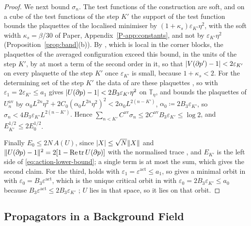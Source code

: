 \documentclass[11pt]{preprint}
\DeclarePairedDelimiter{\abs}{\lvert}{\rvert}
\DeclarePairedDelimiter{\norm}{\lVert}{\rVert}
\numberwithin{equation}{section}
\theoremstyle{definition}
\theoremstyle{remark}
\theoremstyle{plain}
\begin{document}
\begin{proof}
We next bound $\sigma_n$. The test functions of the construction are soft, and on a cube of the test functions of the step $K'$ the support of the test function bounds the plaquettes of the localised minimiser by $(1 + \kappa_s)\varepsilon_{K'}\eta^2$, with the soft width $\kappa_s = \beta/30$ of Paper, Appendix~\ref{P-app:constants}, and not by $\varepsilon_{K'}\eta^2$ (Proposition~\ref{prop:band}(b)). By \cite[Proposition~2]{BalabanAVG}, which is local in the corner blocks, the plaquettes of the averaged configuration exceed this bound, in the units of the step $K'$, by at most a term of the second order in it, so that $\abs{V(\partial p') - 1} < 2\varepsilon_{K'}$ on every plaquette of the step $K'$ once $\varepsilon_{K'}$ is small, because $1 + \kappa_s < 2$. For the determining set of the step $K'$ the data of \cite[(7)]{BalabanVAR} are these plaquettes \cite[p.~278, ll.~39--40]{BalabanVAR}, so \cite[Theorem~1, p.~279]{BalabanVAR} with $\varepsilon_1 = 2\varepsilon_{K'} \leq a_1$ gives $\abs{U(\partial p) - 1} < 2B_3\varepsilon_{K'}\eta^2$ on $\mathbb T_\eta$, and \cite[(53)]{BalabanAVG} bounds the plaquettes of $U^{\mathrm{av}}_n$ by $\alpha_0L^{2n}\eta^2 + 2C_0(\alpha_0L^{2n}\eta^2)^2 < 2\alpha_0L^{2(n-K')}$, $\alpha_0 \coloneqq 2B_3\varepsilon_{K'}$, so $\sigma_n < 4B_3\varepsilon_{K'}L^{2(n-K')}$. Hence $\sum_{n<K'}C^{\mathrm{av}}\sigma_n \leq 2C^{\mathrm{av}}B_3\varepsilon_{K'} \leq \log2$, and $E_{K'}^{1/2} \leq 2E_0^{1/2}$.

Finally $E_0 \leq 2N\,A(U)$, since $\abs X \leq \sqrt N\norm X$ \cite[(20), p.~21]{BalabanAVG} and $\norm{U(\partial p) - 1}^2 = 2[1 - \mathrm{Re}\,\mathrm{tr}\,U(\partial p)]$ with the normalised trace \cite[(17)]{BalabanAVG}, and $E_{K'}$ is the left side of \eqref{eq:action-lower-bound}; a single term is at most the sum, which gives the second claim. For the third, \cite[(7)]{BalabanVAR} holds with $\varepsilon_1 = \varepsilon^{\mathrm{act}} \leq a_1$, so \cite[Theorem~1]{BalabanVAR} gives a minimal orbit in \cite[(2)]{BalabanVAR} with $\varepsilon_0 = B_3\varepsilon^{\mathrm{act}}$, which is the unique critical orbit in \cite[(6)]{BalabanVAR} with $\varepsilon_0 = 2B_3\varepsilon_{K'} \leq a_0$ because $B_3\varepsilon^{\mathrm{act}} \leq 2B_3\varepsilon_{K'}$ \cite[p.~279, l.~15]{BalabanVAR}; $U$ lies in that space, so it lies on that orbit.
\end{proof}

\subsection{Propagators in a Background Field}
\end{document}
